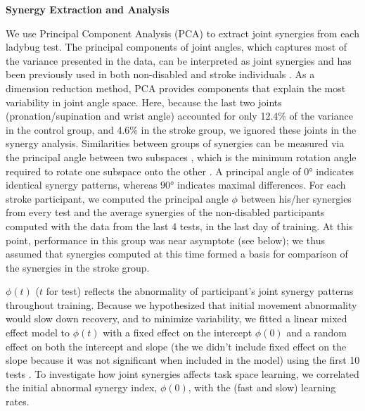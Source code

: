 \textbf{Synergy Extraction and Analysis}

We use Principal Component Analysis (PCA) to extract joint synergies from each ladybug test.
The principal components of joint angles, which captures most of the variance presented in the data, can be interpreted as joint synergies and has been previously used in both non-disabled and stroke individuals \cite{Soechting1997}. 
As a dimension reduction method, PCA provides components that explain the most variability in joint angle space. 
Here, because the last two joints (pronation/supination and wrist angle) accounted for only 12.4\% of the variance in the control group, and 4.6\% in the stroke group, we ignored these joints in the synergy analysis.  
Similarities between groups of synergies can be measured via the principal angle between two subspaces \cite{Bockemuehl2010}, which is the minimum rotation angle required to rotate one subspace onto the other \cite{Bjoerck1973}. 
A principal angle of $ \ang{0} $ indicates identical synergy patterns, whereas $ \ang{90} $ indicates maximal differences.  
For each stroke participant, we computed the principal angle $ \phi $ between his/her synergies from every test and the average synergies of the non-disabled participants computed with the data from the last 4 tests, in the last day of training. 
At this point, performance in this group was near asymptote (see below); we thus assumed that synergies computed at this time formed a basis for comparison of the synergies in the stroke group. 

$ \phi(t) $ ($ t $ for test) reflects the abnormality of participant’s joint synergy patterns throughout training. 
Because we hypothesized that initial movement abnormality would slow down recovery, and to minimize variability, we fitted a linear mixed effect model to $ \phi(t) $ with a fixed effect on the intercept $ \phi(0) $ and   a random effect on both the intercept and slope (the we didn’t include fixed effect on the slope because it was not significant when included in the model)  using the first 10 tests  . 
To investigate how joint synergies affects task space learning, we correlated the initial abnormal synergy index, $ \phi(0) $, with the (fast and slow) learning rates. 

